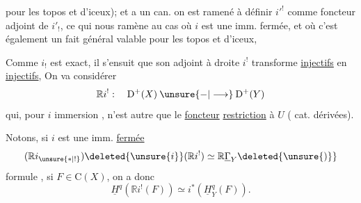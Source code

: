 
 pour les topos et  d'iceux);
et  a un  can.
on est ramené à définir  
$i'^!$ comme foncteur adjoint de $i'_!$, ce qui
nous ramène au cas où $i$ est une imm.
fermée, et où c'est également un fait général
valable pour les topos et  d'iceux,

 Comme $i_!$ est exact,  il s'ensuit
que son adjoint à droite $i^!$ transforme
\uline{injectifs} en \uline{injectifs},  On va
considérer
\[
\mathbb{R}i^!:\quad\mathrm{D}^+(X)\mathbin{\unsure{-|\longrightarrow}}\mathrm{D}^+(Y)
\]
qui, pour $i$ immersion , n'est
autre que le \uline{foncteur} \uline{restriction}
à $U$ ( cat. dérivées).

Notons, si
$i$ est une imm. \uline{fermée}
\[
(\mathbb{R}i_{\unsure{*|!}})\deleted{\unsure{i}}(\mathbb{R}i^!)\simeq \mathbb{R}\underline{\Gamma}_Y\deleted{\unsure{)}}
\]
formule  , 
si $F\in\mathrm{C}(X)$, on a donc
\[
\underline{H}^{q}(\mathbb{R}i^!(F))\simeq i^*(\underline{H}^{q}_Y(F)).
\]
